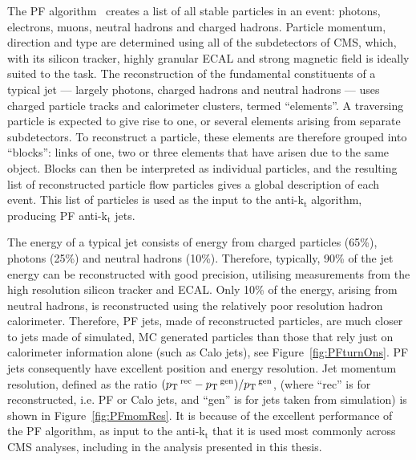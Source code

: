 The \ac{PF} algorithm~\cite{PFT-09-001} creates a list of all stable particles in an event: photons, electrons, muons, neutral hadrons and charged hadrons.
Particle momentum, direction and type are determined using all of the subdetectors of \ac{CMS}, 
which, with its silicon tracker, highly granular \ac{ECAL} and strong magnetic field is ideally suited to the task.
The reconstruction of the fundamental constituents of a typical jet --- largely photons, charged hadrons and neutral hadrons --- uses charged particle tracks and calorimeter clusters, termed ``elements''.
A traversing particle is expected to give rise to one, or several elements arising from separate subdetectors. 
To reconstruct a particle, these elements are therefore grouped into ``blocks'': links of one, two or three elements
that have arisen due to the same object.
Blocks can then be interpreted as individual particles, and the resulting list of reconstructed particle flow particles 
gives a global description of each event.
This list of particles is used as the input to the anti-k$_{\mathrm{t}}$ algorithm, producing \ac{PF} anti-k$_{\mathrm{t}}$ jets.

The energy of a typical jet consists of energy from charged particles (65\%), photons (25\%) and neutral hadrons (10\%).
Therefore, typically, 90\% of the jet energy can be reconstructed with good precision, utilising measurements from the high resolution silicon tracker and \ac{ECAL}. 
Only 10\% of the energy, arising from neutral hadrons, is reconstructed using the relatively poor resolution hadron calorimeter. 
Therefore, \ac{PF} jets, made of reconstructed particles, are much closer to jets made of simulated, \ac{MC} generated particles than those that rely just on calorimeter information alone (such as Calo jets), see Figure~\ref{fig:PFturnOns}.
\ac{PF} jets consequently have excellent position and energy resolution. 
Jet momentum resolution, defined as the ratio $(p_{\text{T}}\,^{\mathrm{rec}} - p_{\text{T}}\,^{\mathrm{gen}})/p_{\text{T}}\,^{\mathrm{gen}}$, (where ``rec'' is for reconstructed, i.e. \ac{PF} or Calo jets, and ``gen'' is for jets taken from simulation) 
is shown in Figure~\ref{fig:PFmomRes}.
It is because of the excellent performance of the \ac{PF} algorithm, as input to the anti-k$_{\mathrm{t}}$ that it is used most commonly across \ac{CMS} analyses, including in the analysis presented in this thesis.

